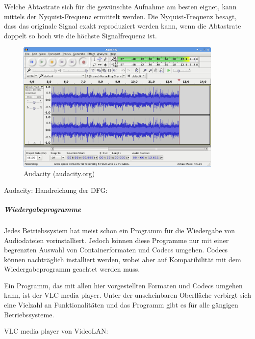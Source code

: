 Welche Abtastrate sich für die gewünschte Aufnahme am besten eignet, kann mittels der Nyquist-Frequenz ermittelt werden. Die Nyquist-Frequenz besagt, dass das originale Signal exakt reproduziert werden kann, wenn die Abtastrate doppelt so hoch wie die höchste Signalfrequenz ist.

\begin{figure}[!htp]
  \begin{center}
    \includegraphics[width=0.9\textwidth]{bilder/audio_audacity}
  \end{center}
	\caption{Audacity (audacity.org)}
\end{figure}

\begin{flushleft}
	Audacity: 
	Handreichung der DFG: 
\end{flushleft}


\subparagraph{Wiedergabeprogramme} Jedes Betriebssystem hat meist schon ein Programm für die Wiedergabe von Audiodateien vorinstalliert. Jedoch können diese Programme nur mit einer begrenzten Auswahl von Containerformaten und Codecs umgehen. Codecs können nachträglich installiert werden, wobei aber auf Kompatibilität mit dem Wiedergabeprogramm geachtet werden muss.

Ein Programm, das mit allen hier vorgestellten Formaten und Codecs umgehen kann, ist der VLC media player. Unter der unscheinbaren Oberfläche verbirgt sich eine Vielzahl an Funktionalitäten und das Programm gibt es für alle gängigen Betriebssysteme.

\begin{flushleft}
	VLC media player von VideoLAN: 
\end{flushleft}


